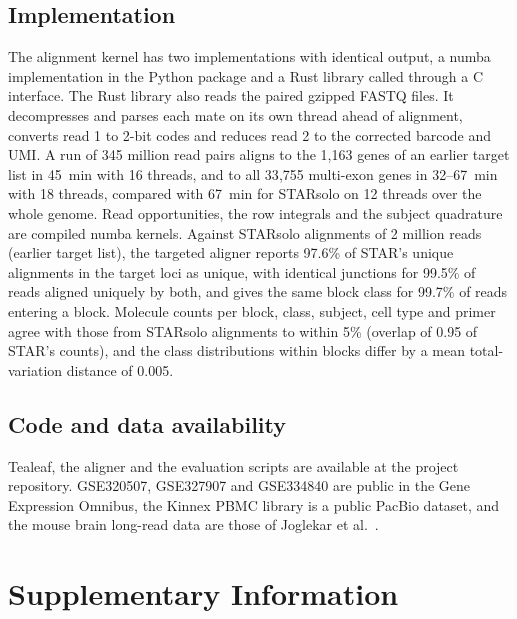 \documentclass[11pt]{article}
\begin{document}
\subsection{Implementation}

The alignment kernel has two implementations with identical output, a numba implementation in the Python package and a Rust library called through a C interface. The Rust library also reads the paired gzipped FASTQ files. It decompresses and parses each mate on its own thread ahead of alignment, converts read 1 to 2-bit codes and reduces read 2 to the corrected barcode and UMI. A run of 345 million read pairs aligns to the 1{,}163 genes of an earlier target list in 45~min with 16 threads, and to all 33{,}755 multi-exon genes in 32--67~min with 18 threads, compared with 67~min for STARsolo on 12 threads over the whole genome. Read opportunities, the row integrals and the subject quadrature are compiled numba kernels. Against STARsolo alignments of 2 million reads (earlier target list), the targeted aligner reports 97.6\% of STAR's unique alignments in the target loci as unique, with identical junctions for 99.5\% of reads aligned uniquely by both, and gives the same block class for 99.7\% of reads entering a block. Molecule counts per block, class, subject, cell type and primer agree with those from STARsolo alignments to within 5\% (overlap of 0.95 of STAR's counts), and the class distributions within blocks differ by a mean total-variation distance of 0.005.

\subsection*{Code and data availability}

Tealeaf, the aligner and the evaluation scripts are available at the project repository. GSE320507, GSE327907 and GSE334840 are public in the Gene Expression Omnibus, the Kinnex PBMC library is a public PacBio dataset, and the mouse brain long-read data are those of Joglekar et al.\ \cite{joglekar2024}.




\clearpage
\appendix
\renewcommand{\thefigure}{S\arabic{figure}}
\renewcommand{\thetable}{S\arabic{table}}
\setcounter{figure}{0}
\setcounter{table}{0}
\section*{Supplementary Information}
\end{document}
